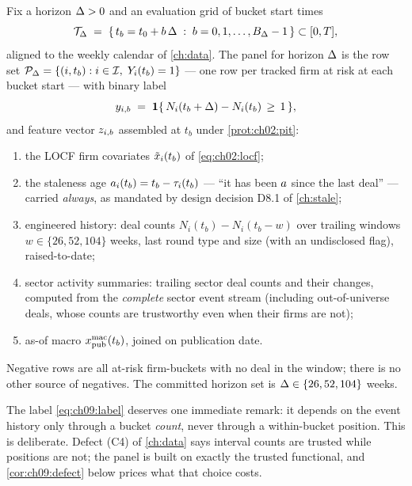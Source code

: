 \begin{definition}\label{def:ch09:panel}
Fix a horizon $\Delta > 0$ and an evaluation grid of bucket start times
\begin{equation}\label{eq:ch09:grid}
\mathcal{T}_{\Delta} \;=\; \{\, t_b = t_0 + b\,\Delta \;:\; b = 0, 1,
\dots, B_{\Delta}-1 \,\} \subset [0, T],
\end{equation}
aligned to the weekly calendar of \cref{ch:data}. The panel for horizon
$\Delta$ is the row set
$\mathcal{P}_{\Delta} = \{ (i, t_b) : i \in \mathcal{I},\; Y_i(t_b) = 1 \}$
--- one row per tracked firm at risk at each bucket start --- with binary
label
\begin{equation}\label{eq:ch09:label}
y_{i,b} \;=\; \mathbf{1}\{\, N_i(t_b + \Delta) - N_i(t_b) \,\ge\, 1 \,\},
\end{equation}
and feature vector $z_{i,b}$ assembled at $t_b$ under
\cref{prot:ch02:pit}:
\begin{enumerate}[label=(\roman*)]
\item the LOCF firm covariates $\tilde{x}_i(t_b)$ of
\cref{eq:ch02:locf};
\item the staleness age $a_i(t_b) = t_b - \tau_i(t_b)$ --- ``it
has been $a$ since the last deal'' --- carried \emph{always},
as mandated by design decision D8.1 of \cref{ch:stale};
\item engineered history: deal counts $N_i(t_b) - N_i(t_b - w)$ over
trailing windows $w \in \{26, 52, 104\}$ weeks, last round type and size
(with an undisclosed flag), raised-to-date;
\item sector activity summaries: trailing sector deal counts and their
changes, computed from the \emph{complete} sector event stream (including
out-of-universe deals, whose counts are trustworthy even when their firms
are not);
\item as-of macro $x^{\mathrm{mac}}_{\mathrm{pub}}(t_b)$, joined on
publication date.
\end{enumerate}
Negative rows are all at-risk firm-buckets with no deal in the window;
there is no other source of negatives. The committed horizon set is
$\Delta \in \{26, 52, 104\}$ weeks.
\end{definition}

The label \cref{eq:ch09:label} deserves one immediate remark: it depends
on the event history only through a bucket \emph{count}, never through a
within-bucket position. This is deliberate. Defect (C4) of \cref{ch:data}
says interval counts are trusted while positions are not; the panel is
built on exactly the trusted functional, and \cref{cor:ch09:defect} below
prices what that choice costs.

